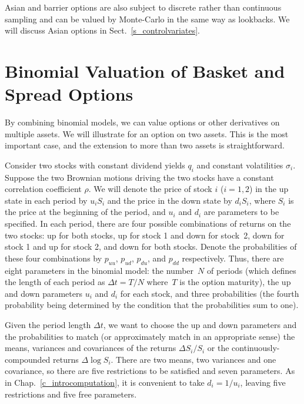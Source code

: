 Asian and barrier options are also subject to discrete rather than continuous sampling and can be valued by Monte-Carlo in the same way as lookbacks.  We will discuss Asian options in Sect.~\ref{s_controlvariates}.

\section{Binomial Valuation of Basket and Spread Options}\label{s_curse}

   By combining binomial models, we can  value options or other derivatives on multiple assets.  We will illustrate for an option on two assets.  This is the most important case, and the extension to more than two assets is straightforward.

Consider two stocks with constant dividend yields $q_i$ and constant volatilities $\sigma_i$.  Suppose the two Brownian motions driving the two stocks have a constant correlation coefficient $\rho$.  We will denote the price of stock $i$ ($i=1,2$) in the up state in each period by $u_iS_i$ and the price in the down state by $d_iS_i$, where $S_i$ is the price at the beginning of the period, and $u_i$ and $d_i$ are parameters to be specified.  In each period, there are four possible combinations of returns on the two stocks:  up for both stocks, up for stock 1 and down for stock~2, down for stock 1 and up for stock 2, and down for both stocks.  Denote the probabilities of these four combinations by $p_{uu}$, $p_{ud}$, $p_{du}$, and $p_{dd}$ respectively.  Thus, there are eight parameters in the binomial model: the number~$N$ of periods (which defines the length of each period as $\varDelta t=T/N$ where~$T$ is the option maturity), the up and down parameters $u_i$ and $d_i$ for each stock, and three probabilities (the fourth probability being determined by the condition that the probabilities sum to one).

Given the period length $\varDelta t$, we want to choose the up and down parameters and the probabilities to match (or approximately match in an appropriate sense) the means, variances and covariances of the returns $\varDelta S_i/S_i$ or the continuously-compounded returns $\varDelta \log S_i$.  There are two means, two variances and one covariance, so there are five restrictions to be satisfied and seven parameters.  As in Chap.~\ref{c_introcomputation}, it is convenient to take $d_i = 1/u_i$, leaving five restrictions and five free parameters.

